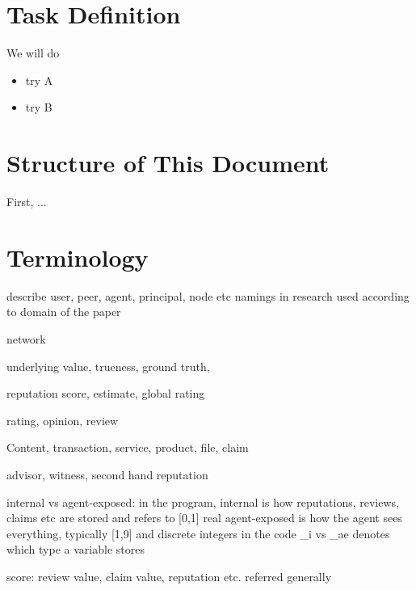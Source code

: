 \documentclass[%
    ]{\PathToTumTemplate/thesis/tum_thesis}
\begin{document}
\section{Task Definition}

We will do

\begin{itemize}
    \item try A
    \item try B
\end{itemize}



\section{Structure of This Document}

First, ...



\section{Terminology}
describe user, peer, agent, principal, node etc namings
in research used according to domain of the paper

network

underlying value, trueness, ground truth, 

reputation score, estimate, global rating

rating, opinion, review

Content, transaction, service, product, file, claim

advisor, witness, second hand reputation


internal vs agent-exposed: in the program, internal is how reputations, reviews, claims etc are stored and refers to [0,1] real
agent-exposed is how the agent sees everything, typically [1,9] and discrete integers
in the code \_i vs \_ae denotes which type a variable stores


score: review value, claim value, reputation etc. referred generally
\end{document}
